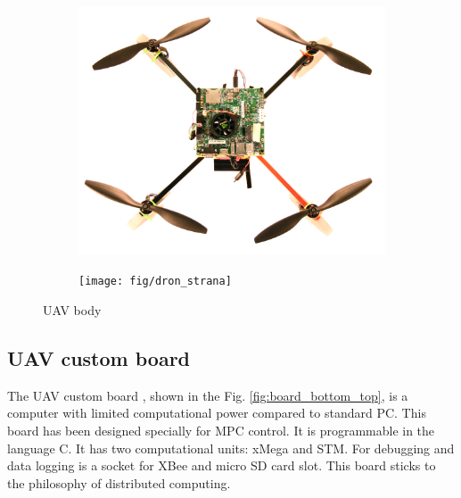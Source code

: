 \documentclass[a4paper,11pt,titlepage]{article}
\begin{document}
\begin{figure}[h]
\centering
\begin{subfigure}{.48\textwidth}
  \centering
  \includegraphics[width=1\linewidth]{fig/dron_up}
\end{subfigure}
\begin{subfigure}{0.48\textwidth}
  \centering
  \texttt{[image: fig/dron\_strana]}
\end{subfigure}
\caption{UAV body}
\label{fig:uav_body_up_down}
\end{figure}


\subsection{UAV custom board}
\label{sec:custom_board}
The UAV custom board \cite{tomas}, shown in the Fig. \ref{fig:board_bottom_top}, is a computer with limited computational power compared to standard PC. This board has been designed specially for MPC control. It is programmable in the language C. It has two computational units: xMega and STM. For debugging and data logging is a socket for XBee and micro SD card slot. This board sticks to the philosophy of distributed computing.
\end{document}
